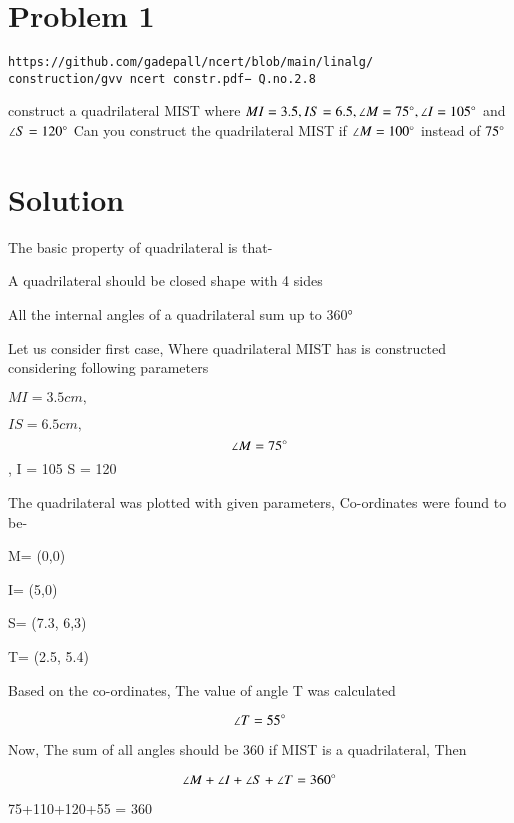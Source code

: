\documentclass[journal,12pt,twocolumn]{IEEEtran}
\begin{document}
\section{Problem 1}
\begin{lstlisting}
https://github.com/gadepall/ncert/blob/main/linalg/
construction/gvv ncert constr.pdf− Q.no.2.8
\end{lstlisting}
construct a quadrilateral MIST where $MI = 3.5, IS = 6.5, \angle M = 75\degree , \angle I = 105\degree$ and $\angle S = 120\degree$
\newline
Can you construct the quadrilateral MIST if $\angle M = 100\degree $ instead of $75\degree$
\section{Solution}
The basic property of quadrilateral is that-

\begin{enumerate}
\begin{lemma}
     \item A quadrilateral should be closed shape with 4 sides
\end{lemma}
\begin{lemma}
     \item All the internal angles of a quadrilateral sum up to 360°
\end{lemma}
\end{enumerate}

Let us consider first case, Where quadrilateral MIST has is constructed considering following parameters

$MI = 3.5 cm,$ 

$IS = 6.5 cm,$
$$\angle M = 75\degree$$ ,
\angle I = 105\degree
\angle S = 120\degree

The quadrilateral was plotted with given parameters,
Co-ordinates were found to be-

M= (0,0)

I= (5,0)

S= (7.3, 6,3)

T= (2.5, 5.4)

Based on the co-ordinates, The value of angle T was calculated

$$\angle T = 55\degree$$

Now, The sum of all angles should be 360\degree
if MIST is a quadrilateral,
Then

$$\angle M+\angle I+\angle S+\angle T= 360\degree$$

75+110+120+55 = 360\degree
\end{document}
